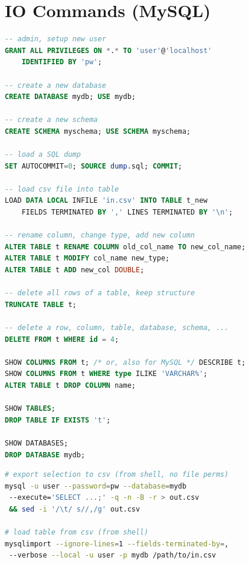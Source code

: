 \section{IO Commands (MySQL)}
\label{sql:io}

\begin{lstlisting}[language=SQL]
-- admin, setup new user
GRANT ALL PRIVILEGES ON *.* TO 'user'@'localhost'
	IDENTIFIED BY 'pw';

-- create a new database
CREATE DATABASE mydb; USE mydb;

-- create a new schema
CREATE SCHEMA myschema; USE SCHEMA myschema;

-- load a SQL dump
SET AUTOCOMMIT=0; SOURCE dump.sql; COMMIT;

-- load csv file into table
LOAD DATA LOCAL INFILE 'in.csv' INTO TABLE t_new
	FIELDS TERMINATED BY ',' LINES TERMINATED BY '\n';

-- rename column, change type, add new column
ALTER TABLE t RENAME COLUMN old_col_name TO new_col_name;
ALTER TABLE t MODIFY col_name new_type;
ALTER TABLE t ADD new_col DOUBLE;

-- delete all rows of a table, keep structure
TRUNCATE TABLE t;

-- delete a row, column, table, database, schema, ...
DELETE FROM t WHERE id = 4;

SHOW COLUMNS FROM t; /* or, also for MySQL */ DESCRIBE t;
SHOW COLUMNS FROM t WHERE type ILIKE 'VARCHAR%';
ALTER TABLE t DROP COLUMN name;

SHOW TABLES;
DROP TABLE IF EXISTS 't';

SHOW DATABASES;
DROP DATABASE mydb;
\end{lstlisting}

\begin{lstlisting}[language=bash]
# export selection to csv (from shell, no file perms)
mysql -u user --password=pw --database=mydb
 --execute='SELECT ...;' -q -n -B -r > out.csv
 && sed -i '/\t/ s//,/g' out.csv

# load table from csv (from shell)
mysqlimport --ignore-lines=1 --fields-terminated-by=,
 --verbose --local -u user -p mydb /path/to/in.csv
\end{lstlisting}
